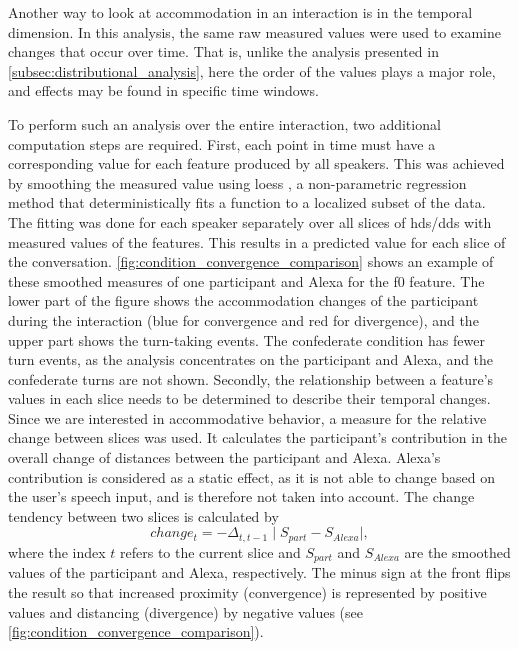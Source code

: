 Another way to look at accommodation in an interaction is in the temporal dimension.
In this analysis, the same raw measured values were used to examine changes that occur over time.
That is, unlike the analysis presented in \cref{subsec:distributional_analysis}, here the order of the values plays a major role, and effects may be found in specific time windows.

To perform such an analysis over the entire interaction, two additional computation steps are required.
First, each point in time must have a corresponding value for each feature produced by all speakers.
This was achieved by smoothing the measured value using \ac{loess} \citep{Cleveland1988locally}, a non-parametric regression method that deterministically fits a function to a localized subset of the data.
The fitting was done for each speaker separately over all slices of \ac{hds}/\ac{dds} with measured values of the features.
This results in a predicted value for each slice of the conversation.
\cref{fig:condition_convergence_comparison} shows an example of these smoothed measures of one participant and Alexa for the \ac{f0} feature.
The lower part of the figure shows the accommodation changes of the participant during the interaction (blue for convergence and red for divergence), and the upper part shows the turn-taking events.
The confederate condition has fewer turn events, as the analysis concentrates on the participant and Alexa, and the confederate turns are not shown.
Secondly, the relationship between a feature's values in each slice needs to be determined to describe their temporal changes.
Since we are interested in accommodative behavior, a measure for the relative change between slices was used.
It calculates the participant's contribution in the overall change of distances between the participant and Alexa.
Alexa's contribution is considered as a static effect, as it is not able to change based on the user's speech input, and is therefore not taken into account.
The change tendency between two slices is calculated by
%
\begin{equation}
\label{eq:change}
change_t = -\Delta_{t, t-1} \mid S_{part} - S_{Alexa} \mid,
\end{equation}
%
where the index $t$ refers to the current slice and $S_{part}$ and $S_{Alexa}$ are the smoothed values of the participant and Alexa, respectively.
The minus sign at the front flips the result so that increased proximity (convergence) is represented by positive values and distancing (divergence) by negative values (see \cref{fig:condition_convergence_comparison}).
